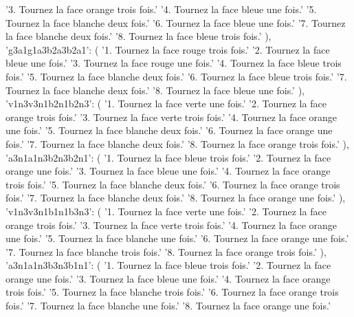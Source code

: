 {{            '3. Tournez la face orange trois fois.\n'
            '4. Tournez la face bleue une fois.\n'
            '5. Tournez la face blanche deux fois.\n'
            '6. Tournez la face bleue une fois.\n'
            '7. Tournez la face blanche deux fois.\n'
            '8. Tournez la face bleue trois fois.'
        ),
        'g3a1g1a3b2a3b2a1': (
            '1. Tournez la face rouge trois fois.\n'
            '2. Tournez la face bleue une fois.\n'
            '3. Tournez la face rouge une fois.\n'
            '4. Tournez la face bleue trois fois.\n'
            '5. Tournez la face blanche deux fois.\n'
            '6. Tournez la face bleue trois fois.\n'
            '7. Tournez la face blanche deux fois.\n'
            '8. Tournez la face bleue une fois.'
        ),
        'v1n3v3n1b2n1b2n3': (
            '1. Tournez la face verte une fois.\n'
            '2. Tournez la face orange trois fois.\n'
            '3. Tournez la face verte trois fois.\n'
            '4. Tournez la face orange une fois.\n'
            '5. Tournez la face blanche deux fois.\n'
            '6. Tournez la face orange une fois.\n'
            '7. Tournez la face blanche deux fois.\n'
            '8. Tournez la face orange trois fois.'
        ),
        'a3n1a1n3b2n3b2n1': (
            '1. Tournez la face bleue trois fois.\n'
            '2. Tournez la face orange une fois.\n'
            '3. Tournez la face bleue une fois.\n'
            '4. Tournez la face orange trois fois.\n'
            '5. Tournez la face blanche deux fois.\n'
            '6. Tournez la face orange trois fois.\n'
            '7. Tournez la face blanche deux fois.\n'
            '8. Tournez la face orange une fois.'
        ),
        'v1n3v3n1b1n1b3n3': (
            '1. Tournez la face verte une fois.\n'
            '2. Tournez la face orange trois fois.\n'
            '3. Tournez la face verte trois fois.\n'
            '4. Tournez la face orange une fois.\n'
            '5. Tournez la face blanche une fois.\n'
            '6. Tournez la face orange une fois.\n'
            '7. Tournez la face blanche trois fois.\n'
            '8. Tournez la face orange trois fois.'
        ),
        'a3n1a1n3b3n3b1n1': (
            '1. Tournez la face bleue trois fois.\n'
            '2. Tournez la face orange une fois.\n'
            '3. Tournez la face bleue une fois.\n'
            '4. Tournez la face orange trois fois.\n'
            '5. Tournez la face blanche trois fois.\n'
            '6. Tournez la face orange trois fois.\n'
            '7. Tournez la face blanche une fois.\n'
            '8. Tournez la face orange une fois.'
}}
